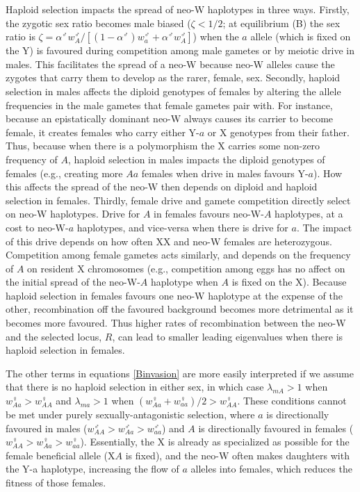 \documentclass[12pt]{article}
\begin{document}
Haploid selection impacts the spread of neo-W haplotypes in three ways.
Firstly, the zygotic sex ratio becomes male biased ($\zeta<1/2$; at equilibrium (B) the sex ratio is $\zeta = \alpha^\male w_A^\male / [(1-\alpha^\male)w_a^\male + \alpha^\male w_A^\male]$) when the $a$ allele (which is fixed on the Y) is favoured during competition among male gametes or by meiotic drive in males. 
This facilitates the spread of a neo-W because neo-W alleles cause the zygotes that carry them to develop as the rarer, female, sex. 
Secondly, haploid selection in males affects the diploid genotypes of females by altering the allele frequencies in the male gametes that female gametes pair with.
For instance, because an epistatically dominant neo-W always causes its carrier to become female, it creates females who carry either Y-$a$ or X genotypes from their father.
Thus, because when there is a polymorphism the X carries some non-zero frequency of $A$, haploid selection in males impacts the diploid genotypes of females (e.g., creating more $Aa$ females when drive in males favours Y-$a$).
How this affects the spread of the neo-W then depends on diploid and haploid selection in females.
Thirdly, female drive and gamete competition directly select on neo-W haplotypes.
Drive for $A$ in females favours neo-W-$A$ haplotypes, at a cost to neo-W-$a$ haplotypes, and vice-versa when there is drive for $a$.
The impact of this drive depends on how often XX and neo-W females are heterozygous.
Competition among female gametes acts similarly, and depends on the frequency of $A$ on resident X chromosomes (e.g., competition among eggs has no affect on the initial spread of the neo-W-$A$ haplotype when $A$ is fixed on the X).
Because haploid selection in females favours one neo-W haplotype at the expense of the other, recombination off the favoured background becomes more detrimental as it becomes more favoured. Thus higher rates of recombination between the neo-W and the selected locus, $R$, can lead to smaller leading eigenvalues when there is haploid selection in females.

The other terms in equations \eqref{Binvasion} are more easily interpreted if we assume that there is no haploid selection in either sex, in which case $\lambda_{mA}>1$ when $w_{Aa}^\female>w_{AA}^\female$ and $\lambda_{ma}>1$ when $(w_{Aa}^\female+w_{aa}^\female)/2>w_{AA}^\female$.
These conditions cannot be met under purely sexually-antagonistic selection, where $a$ is directionally favoured in males ($w_{AA}^\male>w_{Aa}^\male>w_{aa}^\male$) and $A$ is directionally favoured in females ($w_{AA}^\female>w_{Aa}^\female>w_{aa}^\female$).  
Essentially, the X is already as specialized as possible for the female beneficial allele (X$A$ is fixed), and the neo-W often makes daughters with the Y-a haplotype, increasing the flow of $a$ alleles into females, which reduces the fitness of those females.  
\end{document}
